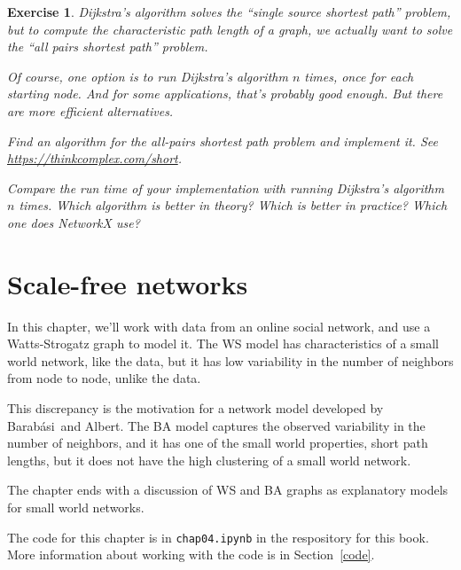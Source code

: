 \documentclass[12pt]{book}
\theoremstyle{exercise}
\newtheorem{exercise}{Exercise}[chapter]
\begin{document}
\begin{exercise}

Dijkstra's algorithm solves the ``single source shortest path''
problem, but to compute the characteristic path length of a graph,
we actually want to solve the ``all pairs shortest path'' problem.


Of course, one option is to run Dijkstra's algorithm $n$ times,
once for each starting node.  And for some applications, that's
probably good enough.  But there are more efficient alternatives.

Find an algorithm for the all-pairs shortest path problem and
implement it.  See
\url{https://thinkcomplex.com/short}.

Compare the run time of your implementation with running
Dijkstra's algorithm $n$ times.  Which algorithm is better in
theory?  Which is better in practice?  Which one does NetworkX
use?


\end{exercise}



\chapter{Scale-free networks}
\label{scale-free}

\newcommand{\Barabasi}{Barab\'{a}si}

In this chapter, we'll work with data from an online social network, and use a
Watts-Strogatz graph to model it.  The WS model has characteristics of
a small world network, like the data, but it has low
variability in the number of neighbors from node to node,
unlike the data.

This discrepancy is the motivation for a network model developed
by \Barabasi~and Albert.  The BA model captures the observed variability
in the number of neighbors, and it has one of the small world
properties, short path lengths, but it does not have the high
clustering of a small world network.

The chapter ends with a discussion of WS and BA graphs as explanatory
models for small world networks.

The code for this chapter is in {\tt chap04.ipynb} in the respository
for this book.  More information about working with the code is
in Section~\ref{code}.
\end{document}
